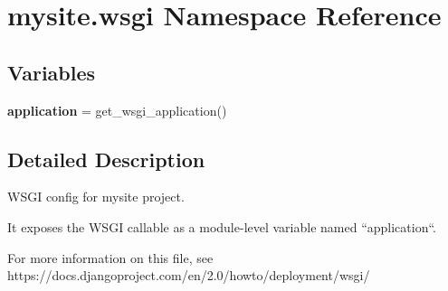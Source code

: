 \hypertarget{namespacemysite_1_1wsgi}{}\section{mysite.\+wsgi Namespace Reference}
\label{namespacemysite_1_1wsgi}
\subsection*{Variables}
\begin{DoxyCompactItemize}
\item 
\mbox{\label{namespacemysite_1_1wsgi_aff79b59b99c8c1c837e143c516adfc7f}} 
{\bfseries application} = get\+\_\+wsgi\+\_\+application()
\end{DoxyCompactItemize}


\subsection{Detailed Description}
\begin{DoxyVerb}WSGI config for mysite project.

It exposes the WSGI callable as a module-level variable named ``application``.

For more information on this file, see
https://docs.djangoproject.com/en/2.0/howto/deployment/wsgi/
\end{DoxyVerb}
 